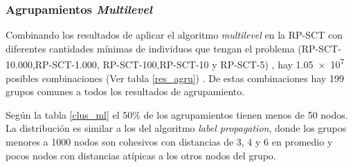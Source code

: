 \subsubsection{Agrupamientos \textit{Multilevel}}
Combinando los resultados de aplicar el algoritmo \textit{multilevel} en la \acrshort{RP-SCT} con diferentes cantidades mínimas de individuos que tengan el problema (RP-SCT-10.000,RP-SCT-1.000, RP-SCT-100,RP-SCT-10 y RP-SCT-5) , hay \num{1.05e7}  posibles combinaciones (Ver tabla \ref{res_agru}) .  De estas combinaciones hay 199 grupos comunes a todos los resultados de agrupamiento.

Según la tabla \ref{clus_ml} el 50\% de los agrupamientos tienen menos de 50 nodos. La distribución es similar a los del algoritmo \textit{label propagation}, donde los grupos menores a 1000 nodos son cohesivos con distancias de 3, 4 y 6 en promedio y pocos nodos con distancias  atípicas a los otros nodos del grupo.

